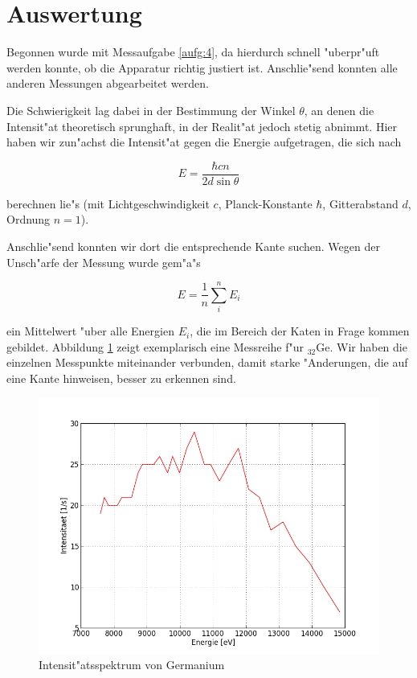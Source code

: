 \section{Auswertung}
	\label{sec:auswertung}
	
	Begonnen wurde mit Messaufgabe \ref{aufg:4}, da hierdurch schnell "uberpr"uft werden konnte, ob die Apparatur richtig justiert ist.
	Anschlie"send konnten alle anderen Messungen abgearbeitet werden.

	Die Schwierigkeit lag dabei in der Bestimmung der Winkel $\theta$, an denen die Intensit"at theoretisch sprunghaft, in der Realit"at jedoch stetig abnimmt.
	Hier haben wir zun"achst die Intensit"at gegen die Energie aufgetragen, die sich nach 

	\begin{equation}
		E = \frac{\hbar c n}{2 d \sin{\theta}}
		\label{eqn:energie}
	\end{equation}

	berechnen lie"s (mit Lichtgeschwindigkeit $c$, Planck-Konstante $\hbar$, Gitterabstand $d$, Ord\-nung $n = 1$).

	Anschlie"send konnten wir dort die entsprechende Kante suchen.
	Wegen der Unsch"arfe der Messung wurde gem"a"s

	\begin{equation}
		E = \frac{1}{n} \sum_i^n E_i
	\end{equation}

	ein Mittelwert "uber alle Energien $E_i$, die im Bereich der Katen in Frage kommen gebildet.
	Abbildung \ref{fig:germanium} zeigt exemplarisch eine Messreihe f"ur ${}_{32}^{}\mathrm{Ge}$.
	Wir haben die einzelnen Mess\-pun\-kte miteinander verbunden, damit starke "Anderungen, die auf eine Kante hinweisen, besser zu erkennen sind.

	\begin{figure}[h!]
		\centering
		\includegraphics[width = 13cm]{img/graph_32_fein.png}
		\caption{Intensit"atsspektrum von Germanium}
		\label{fig:germanium}
	\end{figure}

